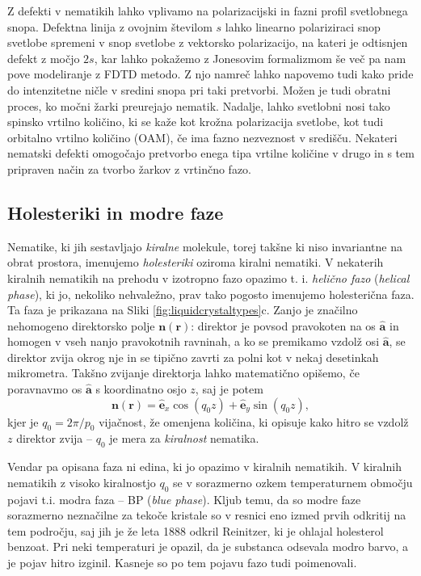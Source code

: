 \documentclass[longbibliography,slovene,a4paper,12pt]{book}
\begin{document}
Z defekti v nematikih lahko vplivamo na polarizacijski in fazni profil svetlobnega snopa. Defektna linija z ovojnim številom $s$ lahko linearno polariziraci snop svetlobe spremeni v snop svetlobe z vektorsko polarizacijo, na kateri je odtisnjen defekt z močjo $2s$, kar lahko pokažemo z Jonesovim formalizmom\cite{cardano} še več pa nam pove modeliranje z FDTD metodo. Z njo namreč lahko napovemo tudi kako pride do intenzitetne ničle v sredini snopa pri taki pretvorbi\cite{cancula2}. Možen je tudi obratni proces, ko močni žarki preurejajo nematik\cite{cancula}. Nadalje, lahko svetlobni nosi tako spinsko vrtilno količino, ki se kaže kot krožna polarizacija svetlobe, kot tudi orbitalno vrtilno količino (OAM), če ima fazno nezveznost v središču. Nekateri nematski defekti omogočajo pretvorbo enega tipa vrtilne količine v drugo in s tem pripraven način za tvorbo žarkov z vrtinčno fazo\cite{marrucci}. 

\subsection{Holesteriki in modre faze}

Nematike, ki jih sestavljajo \emph{kiralne} molekule, torej takšne ki niso invariantne na obrat prostora, imenujemo \emph{holesteriki} oziroma kiralni nematiki. V nekaterih kiralnih nematikih na prehodu v izotropno fazo opazimo  t. i. \emph{helično fazo} (\emph{helical phase}), ki jo, nekoliko nehvaležno, prav tako pogosto imenujemo holesterična faza. Ta faza je prikazana na Sliki \ref{fig:liquidcrystaltypes}c. Zanjo je značilno nehomogeno direktorsko polje $\mathbf{n}(\mathbf{r})$: direktor je povsod pravokoten na os $\mathbf{\hat{a}}$ in homogen v vseh nanjo pravokotnih ravninah, a ko se premikamo vzdolž osi $\mathbf{\hat{a}}$, se direktor zvija okrog nje in se tipično zavrti za polni kot v nekaj desetinkah mikrometra. Takšno zvijanje direktorja lahko matematično opišemo, če poravnavmo os $\mathbf{\hat{a}}$ s koordinatno osjo $z$, saj je potem
\begin{equation}
\mathbf{n} (\mathbf{r}) = \mathbf{\hat{e}}_x \cos (q_0z) + \mathbf{\hat{e}}_y \sin(q_0z),
\end{equation}
kjer je $q_0=2\pi/p_0$ vijačnost, že omenjena količina, ki opisuje kako hitro se vzdolž $z$ direktor zvija -- $q_0$ je mera za \emph{kiralnost} nematika\cite{wright}.

Vendar pa opisana faza ni edina, ki jo opazimo v kiralnih nematikih. V kiralnih nematikih z visoko kiralnostjo $q_0$ se v sorazmerno ozkem temperaturnem območju pojavi t.i. modra faza -- BP (\emph{blue phase}). Kljub temu, da so modre faze sorazmerno neznačilne za tekoče kristale so v resnici eno izmed prvih odkritij na tem področju, saj jih je že leta 1888 odkril Reinitzer, ki je ohlajal holesterol benzoat. Pri neki temperaturi je opazil, da je substanca odsevala modro barvo, a je pojav hitro izginil. Kasneje so po tem pojavu fazo tudi poimenovali. \\
\end{document}
